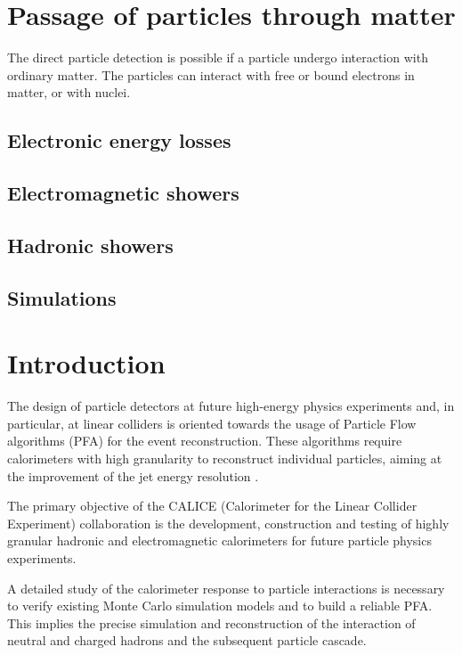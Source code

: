 \section{Passage of particles through matter}
The direct particle detection is possible if a particle undergo interaction with ordinary matter. %
The particles can interact with free or bound electrons in matter, or with nuclei. 

\subsection{Electronic energy losses}

\subsection{Electromagnetic showers}
\subsection{Hadronic showers}
\subsection{Simulations}

\section{Introduction}

The design of particle detectors at future high-energy physics experiments and, in particular, at linear colliders is oriented towards the usage of Particle Flow algorithms (PFA) for the event reconstruction. 
These algorithms require calorimeters with high granularity to reconstruct individual particles, aiming at the improvement of the jet energy resolution \cite{Brient:2002gh}. 

The primary objective of the CALICE (Calorimeter for the Linear Collider Experiment) collaboration is the development, construction and testing of highly granular hadronic and electromagnetic  calorimeters for future particle physics experiments.

A detailed study of the calorimeter response to particle interactions is necessary to verify existing Monte Carlo simulation models and to build a reliable PFA. 
This implies the precise simulation and reconstruction of the interaction of neutral and charged hadrons and the subsequent particle cascade.

